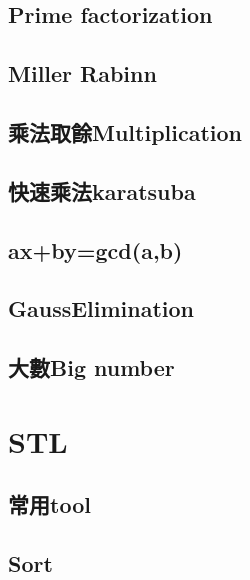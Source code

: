 \subsection{Prime factorization}


\subsection{Miller Rabinn}


\subsection{乘法取餘Multiplication}


\subsection{快速乘法karatsuba}


\subsection{ax+by=gcd(a,b)}


\subsection{GaussElimination}


\subsection{大數Big number}


\section{STL}

\subsection{常用tool}


\subsection{Sort}


